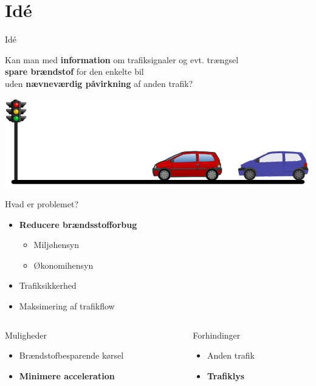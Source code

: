 \section{Idé}

\begin{frame}{Idé}
\begin{center}
Kan man med \textbf{information} om trafiksignaler og evt. trængsel\\\textbf{spare brændstof} for den enkelte bil\\uden \textbf{nævneværdig påvirkning} af anden trafik?
\end{center}
\includegraphics[width=1\textwidth]{images/figure.png}
\end{frame}

\begin{frame}{Hvad er problemet?}
\begin{itemize}
\item \textbf{Reducere brændsstofforbug}
\begin{itemize}
\item Miljøhensyn
\item Økonomihensyn
\end{itemize}
\item Trafiksikkerhed
\item Maksimering af trafikflow
\end{itemize}

\vspace{5mm}
\begin{columns}
\begin{column}{0.5\textwidth}
Muligheder
\begin{itemize}
\item Brændstofbesparende kørsel
\item \textbf{Minimere acceleration}
\end{itemize}

\end{column}
\begin{column}{0.5\textwidth}
Forhindinger
\begin{itemize}
\item Anden trafik
\item \textbf{Trafiklys}
\end{itemize}
\end{column}
\end{columns}
\end{frame}

